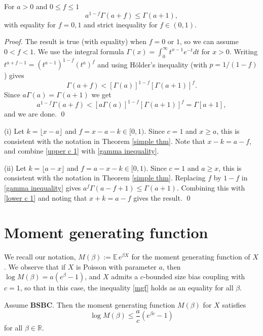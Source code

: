 \documentclass[smallextended,envcountsect]{svjour3}
\begin{document}
\begin{lemma} \label{lemma gamma}
 For $a > 0$ and $0 \le f \le 1$
\begin{equation}\label{gamma inequality}
     a^{1-f}\Gamma(a+f) \le \Gamma(a+1),
\end{equation}
with equality for $f=0,1$ and strict inequality for $f \in (0,1)$.
\end{lemma}

\begin{proof}  The result is true (with equality) when $f = 0$ or $1$, so we can assume $0 < f < 1$.  We use the integral formula $\Gamma(x) = \int_0^\infty t^{x-1}e^{-t}dt$ for $x > 0$.   Writing $t^{a+f-1} = (t^{a-1})^{1-f} (t^a)^f$ and using H\"older's inequality (with $p = 1/(1-f)$) gives
   $$\Gamma(a+f)  < \left[\Gamma(a)\right]^{1-f}\left[\Gamma(a+1)\right]^f.
   $$
Since $ a \Gamma(a) = \Gamma(a+1)$ we get
    $$a^{1-f}\Gamma(a+f) < \left[a\Gamma(a)\right]^{1-f}\left[\Gamma(a+1)\right]^f = \Gamma[a+1],
   $$
and we are done.  \qed \end{proof}

\vspace{2ex}

(i) Let $k = \lfloor x-a \rfloor$ and $f= x-a-k \in [0,1)$.  Since $c=1$ and $x \ge a$, this is consistent with the notation in Theorem \ref{simple thm}.  Note that $x-k=a-f$, and combine \eqref{upper c 1} with  \eqref{gamma inequality}.

\noindent (ii)  Let $k = \lfloor a-x \rfloor$ and $f = a-x-k \in [0,1).$  Since $c=1$ and $a \ge x$, this is consistent with the notation in Theorem \ref{simple thm}.  Replacing $f$ by $1-f$ in \eqref{gamma inequality} gives $a^f \Gamma(a-f+1) \le \Gamma(a+1)$.  Combining this with \eqref{lower c 1} and noting that $x+k=a-f$ gives the result.  \qed

\section{Moment generating function} \label{sect AB}

We recall our notation, $M(\beta) := {\mathbb{E \,}} e^{\beta X}$ for the moment generating function of $X$.  We observe that if $X$ is Poisson with parameter $a$, then ${{\log M}}(\beta) = a(e^{\beta}-1)$, and $X$ admits a $c$-bounded size bias coupling with $c=1$, so that in this case, the inequality
\eqref{mgf} holds as an equality for all $\beta$.

\begin{proposition} \label{prop mgf}
Assume {\bf BSBC}.  Then the moment generating function $M(\beta)$ for $X$ satisfies
    \begin{equation} \label{mgf}
    {{\log M}}(\beta) \le  \frac{a}{c}\left(e^{\beta c}-1\right)
    \end{equation}
for all $\beta \in {\mathbb{R}}$.
    \end{proposition}
\end{document}
